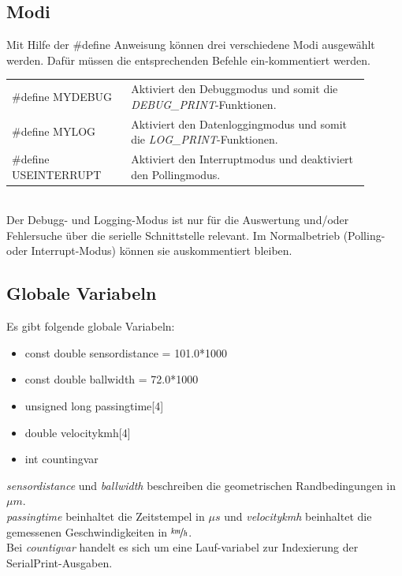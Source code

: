 \clearpage
\subsection{Modi}
Mit Hilfe der \#define Anweisung können drei verschiedene Modi ausgewählt werden. Dafür müssen die entsprechenden Befehle ein-kommentiert werden.\\

\begin{tabular}{L{0.3\linewidth} L{0.6\linewidth}}
    \#define MYDEBUG & Aktiviert den Debuggmodus und somit die \textit{DEBUG\_PRINT}-Funktionen.\\
    \#define MYLOG & Aktiviert den Datenloggingmodus und somit die \textit{LOG\_PRINT}-Funktionen.\\
    \#define USEINTERRUPT & Aktiviert den Interruptmodus und deaktiviert den Pollingmodus.\\
\end{tabular}\\

Der Debugg- und Logging-Modus ist nur für die Auswertung und/oder Fehlersuche über die serielle Schnittstelle relevant. Im Normalbetrieb (Polling- oder Interrupt-Modus) können sie auskommentiert bleiben.
\subsection{Globale Variabeln}
Es  gibt folgende globale Variabeln:
\begin{itemize}
    \item const double sensordistance = 101.0*1000
    \item const double ballwidth = 72.0*1000
    \item unsigned long passingtime[4]
    \item double velocitykmh[4]
    \item int countingvar
\end{itemize}

\textit{sensordistance} und \textit{ballwidth} beschreiben die geometrischen Randbedingungen in $\mu m$.\\
\textit{passingtime} beinhaltet die Zeitstempel in $\mu s$ und \textit{velocitykmh} beinhaltet die gemessenen Geschwindigkeiten in $\nicefrac{km}{h}$.\\
Bei \textit{countigvar} handelt es sich um eine Lauf-variabel zur Indexierung der SerialPrint-Ausgaben.


